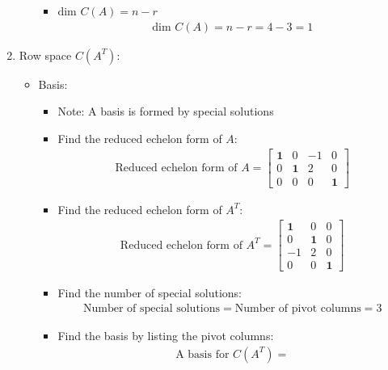 \documentclass[10pt,a4paper]{article}
\begin{document}
\begin{enumerate}
\begin{itemize}
        \begin{itemize}
            \item $\text{dim }C(A) = n-r$
            \begin{align*}
                \text{dim }C(A) = n-r = 4-3 = 1
            \end{align*}
        \end{itemize}
    \end{itemize}
    \item Row space $C(A^T)$:
    \begin{itemize}
        \item Basis:
        \begin{itemize}
            \item Note: A basis is formed by special solutions
            \item Find the reduced echelon form of $A$:
            \begin{align*}
                \text{Reduced echelon form of }A = 
                \begin{bmatrix}
                    \textbf{1}&0&-1&0 \\
                    0&\textbf{1}&2&0 \\
                    0&0&0&\textbf{1}
                \end{bmatrix}
            \end{align*}
            \item Find the reduced echelon form of $A^T$:
            \begin{align*}
                \text{Reduced echelon form of }A^T = 
                \begin{bmatrix}
                    \textbf{1}&0&0 \\
                    0&\textbf{1}&0 \\
                    -1&2&0 \\
                    0&0&\textbf{1}
                \end{bmatrix}
            \end{align*}
            \item Find the number of special solutions:
            \begin{align*}
                \text{Number of special solutions}=\text{Number of pivot columns}=3
            \end{align*}
            \item Find the basis by listing the pivot columns:
            \begin{align*}
                \text{A basis for }C(A^T) = 

\end{align*}
\end{itemize}
\end{itemize}
\end{enumerate}
\end{document}
